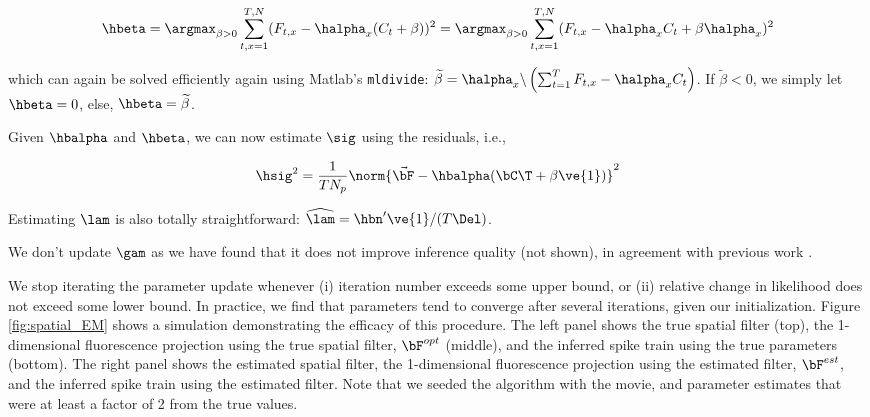 \begin{align}
\hbeta 
= \argmax_{\beta>0} \sum_{t,x=1}^{T,N} (F_{t,x} - \halpha_x(C_t + \beta))^2 
= \argmax_{\beta>0} \sum_{t,x=1}^{T,N} (F_{t,x} - \halpha_x C_t + \beta \halpha_x)^2 
\end{align}

\noindent which can again be solved efficiently again using Matlab's \texttt{mldivide}: $\widetilde{\beta}= \halpha_x \backslash \left(\sum_{t=1}^T F_{t,x} - \halpha_x C_t\right)$.  If $\widetilde{\beta}<0$, we simply let $\hbeta=0$, else, $\hbeta=\widetilde{\beta}$.

Given $\hbalpha$ and $\hbeta$, we can now estimate $\sig$ using the residuals, i.e.,

\begin{align}
	\hsig^2 = \frac{1}{T N_p}\norm{\vec{\bF} - \hbalpha(\bC\T + \beta \ve{1})}^2
\end{align}

Estimating $\lam$ is also totally straightforward: $\widehat{\lam} = \hbn' \ve{1}/ (T \Del)$. 
% 

We don't update $\gam$ as we have found that it does not improve inference quality (not shown), in agreement with previous work \cite{YaksiFriedrich07}.


We stop iterating the parameter update whenever (i) iteration number exceeds some upper bound, or (ii) relative change in likelihood does not exceed some lower bound.  In practice, we find that parameters tend to converge after several iterations, given our initialization.  Figure \ref{fig:spatial_EM} shows a simulation demonstrating the efficacy of this procedure.  The left panel shows the true spatial filter (top), the 1-dimensional fluorescence projection using the true spatial filter, $\bF^{opt}$ (middle), and the inferred spike train using the true parameters (bottom).  The right panel shows the estimated spatial filter, the 1-dimensional fluorescence projection using the estimated filter, $\bF^{est}$, and the inferred spike train using the estimated filter.  Note that we seeded the algorithm with the movie, and parameter estimates that were at least a factor of 2 from the true values.

